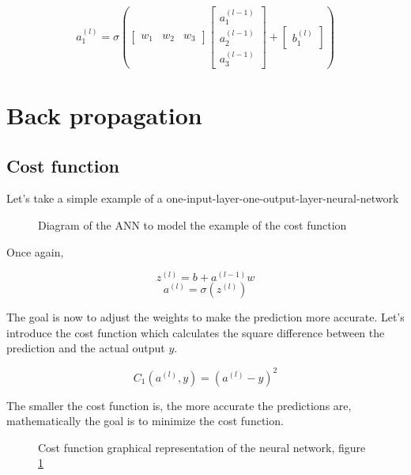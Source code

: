 \documentclass[]{report}
\begin{document}
\[a^{(l)}_1=\sigma\left(\begin{bmatrix}w_1 & w_2 & w_3\end{bmatrix}\begin{bmatrix}a^{(l-1)}_1 \\ a^{(l-1)}_2 \\ a^{(l-1)}_3\end{bmatrix}+\begin{bmatrix}b^{(l)}_1\end{bmatrix}\right)\]

\section{Back propagation}

\subsection{Cost function}

{Let's take a simple example of a one-input-layer-one-output-layer-neural-network}

\begin{figure}[H]
    \centering
    \begin{neuralnetwork}[height=2, nodespacing=15mm]
        \newcommand{\inputtext}[2]{$a^{(l-1)}$}
        \newcommand{\outputtext}[2]{$a^{(l)}$}
        \inputlayer[count=1, bias=false, text=\inputtext, title=Input layer]
        \outputlayer[count=1,  text=\outputtext, title=Output layer]
        \linklayers[title=Weight $w$]
    \end{neuralnetwork}
    \caption{Diagram of the ANN to model the example of the cost function}
    \label{fig:simplenn}
\end{figure}

{Once again,}

\[z^{(l)}=b+a^{(l-1)}w\]
\[a^{(l)}=\sigma\left(z^{(l)}\right)\]

{The goal is now to adjust the weights to make the prediction more accurate. Let's introduce the cost function which calculates the square difference between the prediction and the actual output $y$.}

\[C_1\left(a^{(l)},y\right)=\left(a^{(l)}-y\right)^2\]

{The smaller the cost function is, the more accurate the predictions are, mathematically the goal is to minimize the cost function.}

\begin{figure}[H]
    \centering
    \caption{Cost function graphical representation of the neural network, figure \ref{fig:simplenn}}
\end{figure}
\end{document}
